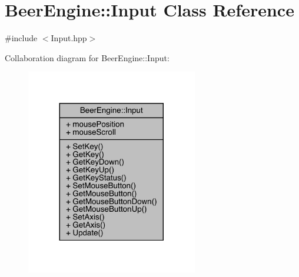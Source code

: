 \hypertarget{class_beer_engine_1_1_input}{}\section{Beer\+Engine\+:\+:Input Class Reference}
\label{class_beer_engine_1_1_input}


{\ttfamily \#include $<$Input.\+hpp$>$}



Collaboration diagram for Beer\+Engine\+:\+:Input\+:\nopagebreak
\begin{figure}[H]
\begin{center}
\leavevmode
\includegraphics[width=212pt]{class_beer_engine_1_1_input__coll__graph}
\end{center}
\end{figure}
